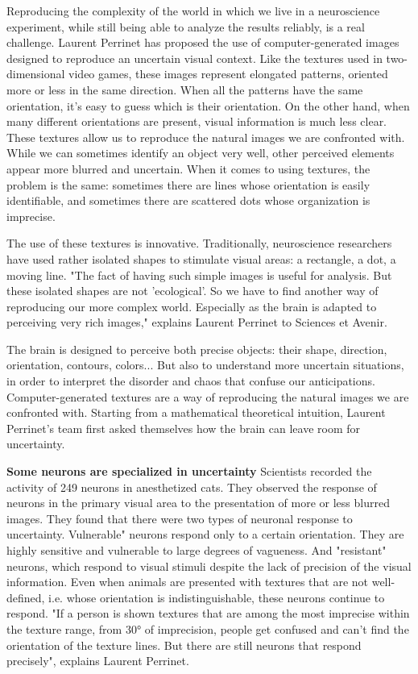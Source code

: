 Reproducing the complexity of the world in which we live in a neuroscience experiment, while still being able to analyze the results reliably, is a real challenge. Laurent Perrinet has proposed the use of computer-generated images designed to reproduce an uncertain visual context. Like the textures used in two-dimensional video games, these images represent elongated patterns, oriented more or less in the same direction. When all the patterns have the same orientation, it's easy to guess which is their orientation. On the other hand, when many different orientations are present, visual information is much less clear. These textures allow us to reproduce the natural images we are confronted with. While we can sometimes identify an object very well, other perceived elements appear more blurred and uncertain. When it comes to using textures, the problem is the same: sometimes there are lines whose orientation is easily identifiable, and sometimes there are scattered dots whose organization is imprecise.

The use of these textures is innovative. Traditionally, neuroscience researchers have used rather isolated shapes to stimulate visual areas: a rectangle, a dot, a moving line. "The fact of having such simple images is useful for analysis. But these isolated shapes are not 'ecological'. So we have to find another way of reproducing our more complex world. Especially as the brain is adapted to perceiving very rich images," explains Laurent Perrinet to Sciences et Avenir.

The brain is designed to perceive both precise objects: their shape, direction, orientation, contours, colors... But also to understand more uncertain situations, in order to interpret the disorder and chaos that confuse our anticipations. Computer-generated textures are a way of reproducing the natural images we are confronted with. Starting from a mathematical theoretical intuition, Laurent Perrinet's team first asked themselves how the brain can leave room for uncertainty.

\textbf{Some neurons are specialized in uncertainty}
Scientists recorded the activity of 249 neurons in anesthetized cats. They observed the response of neurons in the primary visual area to the presentation of more or less blurred images. They found that there were two types of neuronal response to uncertainty. Vulnerable" neurons respond only to a certain orientation. They are highly sensitive and vulnerable to large degrees of vagueness. And "resistant" neurons, which respond to visual stimuli despite the lack of precision of the visual information. Even when animals are presented with textures that are not well-defined, i.e. whose orientation is indistinguishable, these neurons continue to respond.
"If a person is shown textures that are among the most imprecise within the texture range, from 30° of imprecision, people get confused and can't find the orientation of the texture lines. But there are still neurons that respond precisely", explains Laurent Perrinet.


